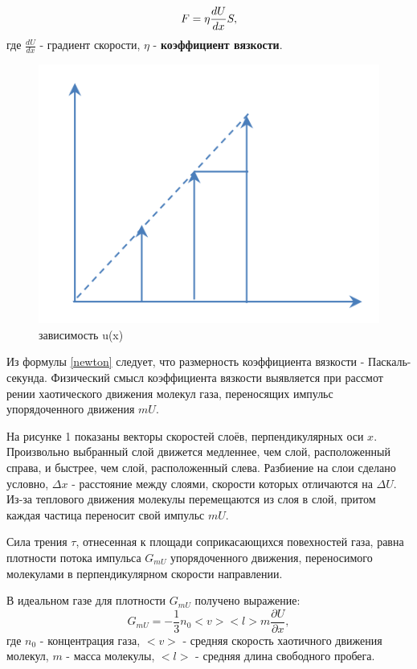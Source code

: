 \documentclass[a4paper,12pt]{article}
\begin{document}
\begin{equation}\label{newton}
F = \eta\frac{dU}{dx}S,
\vspace{0.3cm}
\end{equation}
где $\frac{dU}{dx}$ - градиент скорости, $\eta$ - \textbf{коэффициент вязкости}.

\begin{figure}[h!]
\begin{center}
	\includegraphics[scale=0.3]{1}
\end{center}
\caption{зависимость u(x)}
\end{figure}


Из формулы \eqref{newton} следует, что размерность коэффициента вязкости - Паскаль-секунда.
Физический смысл коэффициента вязкости выявляется при рассмот
рении хаотического движения молекул газа, переносящих импульс упорядоченного движения $mU$.

На рисунке 1 показаны векторы скоростей слоёв, перпендикулярных оси $x$. Произвольно выбранный слой движется медленнее, чем слой, расположенный справа, и быстрее, чем слой, расположенный слева. Разбиение на слои сделано условно, $\Delta x$ - расстояние между слоями, скорости которых отличаются на $\Delta U$. Из-за теплового движения молекулы перемещаются из слоя в слой, притом каждая частица переносит свой импульс $mU$.

Сила трения $\tau$, отнесенная к площади соприкасающихся повехностей газа, равна плотности потока импульса $G_{mU}$ упорядоченного движения, переносимого молекулами в перпендикулярном скорости направлении.

В идеальном газе для плотности $G_{mU}$ получено выражение:
\begin{equation}
G_{mU} = -\frac{1}{3}n_0<v><l>m\frac{\partial U}{\partial x},
\end{equation}
где $n_0$ - концентрация газа, $<v>$ - средняя скорость хаотичного движения молекул, $m$ - масса молекулы, $<l>$ - средняя длина свободного пробега.
\end{document}
